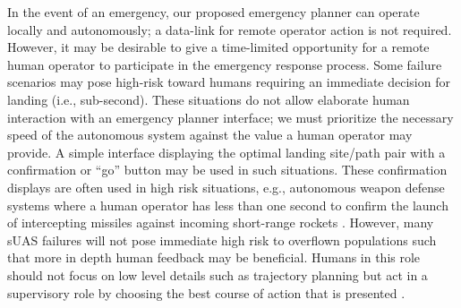 In the event of an emergency, our proposed emergency planner can operate locally and autonomously; a data-link for remote operator action is not required. However, it may be desirable to give a time-limited opportunity for a remote human operator to participate in the emergency response process. Some failure scenarios may pose high-risk toward humans requiring an immediate decision for landing (i.e., sub-second). These situations do not allow elaborate human interaction with an emergency planner interface; we must prioritize the necessary speed of the autonomous system against the value a human operator may provide. A simple interface displaying the optimal landing site/path pair with a confirmation or ``go'' button may be used in such situations. These confirmation displays are often used in high risk situations, e.g., autonomous weapon defense systems where a human operator has less than one second to confirm the launch of intercepting missiles against incoming short-range rockets \cite{docherty2012losing}. However, many \ac{sUAS} failures will not pose immediate high risk to overflown populations such that more in depth human feedback may be beneficial. Humans in this role should not focus on low level details such as trajectory planning but act in a supervisory role by choosing the best course of action that is presented \cite{gutzwiller_human-computer_2015}.

